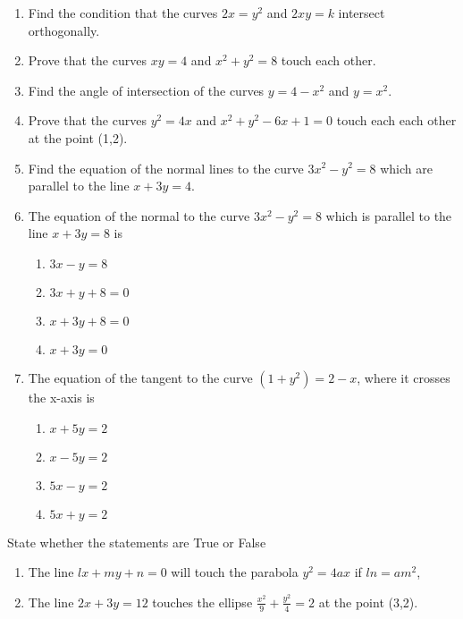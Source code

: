 \begin{enumerate}[label=\thesubsection.\arabic*,ref=\thesubsection.\theenumi]
\item Find the condition that the curves $2x=y^2$ and $2xy=k$ intersect orthogonally.
\item Prove that the curves $xy=4$ and $x^2+y^2=8$ touch each other.
\item Find the angle of intersection of the curves $y=4-x^2$ and $y=x^2$.
\item Prove that the curves $y^2=4x$ and $x^2+y^2-6x+1=0$ touch each each other at the point (1,2).
\item Find the equation of the normal lines to the curve $3x^2-y^2=8$ which are parallel to the line $x+3y=4$.
 \item The equation of the normal to the curve $3x^2-y^2 =8$ which is parallel to the line $x+3y=8$ is
 \begin{enumerate}
 \item $3x-y=8$
 \item $3x+y+8=0$
 \item $x+3y+8=0$
 \item $x+3y=0$
 \end{enumerate}
\item The equation of the tangent to the curve $(1+y^2) =2-x$, where it crosses the x-axis is 
\begin{enumerate}
\item $x+5y=2$
\item $x-5y=2$
\item $5x-y=2$
\item $5x+y=2$
\end{enumerate}
\end{enumerate}
State whether the statements are True or False 
\begin{enumerate}[label=\thesection.\arabic*,ref=\thesection.\theenumi,resume*]
\item The line $lx+my+n=0$ will touch the parabola $y^2=4 ax$ if $ln =am^2$,
\item The line $2x+3y=12$ touches the ellipse $\frac{x^2}{9}+\frac{y^2}{4}=2$ at the point (3,2).
\end{enumerate}
